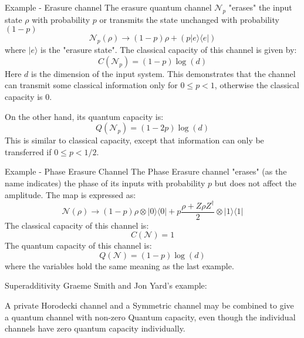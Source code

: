 \begin{frame}{Example - Erasure channel}
        The erasure quantum channel $\mathcal{N}_p$ "erases" the input state $\rho$
        with probability $p$ or transmits the state unchanged with probability $(1−p)$
        \begin{equation}
            \mathcal{N}_p(\rho) \rightarrow (1-p)\rho + (p| e \rangle\langle e |)
        \end{equation}
        where $|e\rangle$ is the "erasure state".
        The classical capacity of this channel is given by:
        \begin{equation}
            C(\mathcal{N}_p) = (1-p)\log (d)
        \end{equation}
        Here $d$ is the dimension of the input system. This demonstrates that the channel
        can transmit some classical information only for $0 \leq p < 1$, otherwise the
        classical capacity is $0$.
        
        On the other hand, its quantum capacity is:
        \begin{equation}
            Q(\mathcal{N}_p) = (1-2p)\log (d)
        \end{equation}
        This is similar to classical capacity, except that information can only be transferred
        if $0 \leq p < 1/2$.
\end{frame}
\begin{frame}{Example - Phase Erasure Channel}
        The Phase Erasure channel "erases" (as the name indicates) the phase of its inputs with
        probability $p$ but does not affect the amplitude. The map is expressed as:
        \begin{equation}
            \mathcal{N}(\rho) \rightarrow (1-p)\rho \otimes |0\rangle\langle 0| + p\frac{\rho + Z\rho Z^\dagger}{2}\otimes |1\rangle\langle 1|
        \end{equation}
        The classical capacity of this channel is:
        \begin{equation}
            C(\mathcal{N}) = 1
        \end{equation}
        The quantum capacity of this channel is:
        \begin{equation}
            Q(\mathcal{N}) = (1-p)\log (d)
        \end{equation}
        where the variables hold the same meaning as the last example.
\end{frame}

\begin{frame}{Superadditivity}
    Graeme Smith and Jon Yard's example:

    A private Horodecki channel and a Symmetric channel may be combined to
    give a quantum channel with non-zero Quantum capacity, even though the
    individual channels have zero quantum capacity individually.
\end{frame}